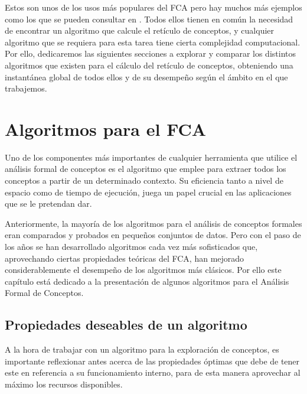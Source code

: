 \documentclass[oneside,openright,titlepage,numbers=noenddot,openany,headinclude,footinclude=true,
cleardoublepage=empty,abstractoff,BCOR=5mm,paper=a4,fontsize=12pt,main=spanish]{scrreprt}
\begin{document}
Estos son unos de los usos más populares del FCA pero hay muchos más ejemplos como los que se pueden consultar en \cite{Ganter}. Todos ellos tienen en común la necesidad de encontrar un algoritmo que calcule el retículo de conceptos, y cualquier algoritmo que se requiera para esta tarea tiene cierta complejidad computacional. Por ello, dedicaremos las siguientes secciones a explorar y comparar los distintos algoritmos que existen para el cálculo del retículo de conceptos, obteniendo una instantánea global de todos ellos y de su desempeño según el ámbito en el que trabajemos.


\chapter{Algoritmos para el FCA}
   \label{chap:4}
Uno de los componentes más importantes de cualquier herramienta que utilice el análisis formal de conceptos es el algoritmo que emplee para extraer todos los conceptos a partir de un determinado contexto. Su eficiencia tanto a nivel de espacio como de tiempo de ejecución, juega un papel crucial en las aplicaciones que se le pretendan dar.

Anteriormente, la mayoría de los algoritmos para el análisis de conceptos formales eran comparados y probados en pequeños conjuntos de datos. Pero con el paso de los años se han desarrollado algoritmos cada vez más sofisticados que, aprovechando ciertas propiedades teóricas del FCA, han mejorado considerablemente el desempeño de los algoritmos más clásicos. Por ello este capítulo está dedicado a la presentación de algunos algoritmos para el Análisis Formal de Conceptos.

\section{Propiedades deseables de un algoritmo}

A la hora de trabajar con un algoritmo para la exploración de conceptos, es importante reflexionar antes acerca de las propiedades óptimas que debe de tener este en referencia a su funcionamiento interno, para de esta manera aprovechar al máximo los recursos disponibles.
\end{document}

